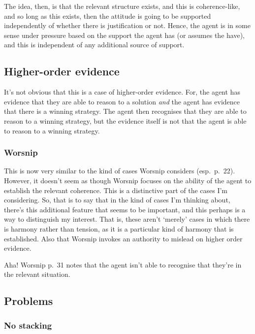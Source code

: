 \documentclass[10pt]{article}
\begin{document}
The idea, then, is that the relevant structure exists, and this is coherence-like, and so long as this exists, then the attitude is going to be supported independently of whether there is justification or not.
Hence, the agent is in some sense under pressure based on the support the agent has (or assumes the have), and this is independent of any additional source of support.

\subsection{Higher-order evidence}
\label{sec:high-order-evid}

It's not obvious that this is a case of higher-order evidence.
For, the agent has evidence that they are able to reason to a solution \emph{and} the agent has evidence that there is a winning strategy.
The agent then recognises that they are able to reason to a winning strategy, but the evidence itself is not that the agent is able to reason to a winning strategy.

\subsubsection{Worsnip}
\label{sec:worsnip}

This is now very similar to the kind of cases Worsnip considers (esp.\ p.\ 22).
However, it doesn't seem as though Worsnip focuses on the ability of the agent to establish the relevant coherence.
This is a distinctive part of the cases I'm considering.
So, that is to say that in the kind of cases I'm thinking about, there's this additional feature that seems to be important, and this perhaps is a way to distinguish my interest.
That is, these aren't `merely' cases in which there is harmony rather than tension, as it is a particular kind of harmony that is established.
Also that Worsnip invokes an authority to mislead on higher order evidence.

Aha!
Worsnip p.\ 31 notes that the agent isn't able to recognise that they're in the relevant situation.



\subsection{Problems}
\label{sec:problems}


\subsubsection{No stacking}
\label{sec:no-stacking}
\end{document}

